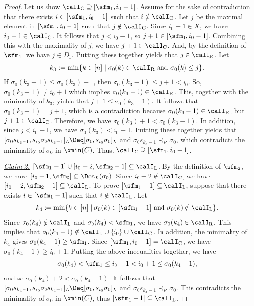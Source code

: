 \documentclass[12pt, reqno]{amsart}
\theoremstyle{definition}
\numberwithin{equation}{section} \numberwithin{figure}{section}
\numberwithin{table}{section}
\begin{document}
\begin{proof}
Let us show $\calI_\mathrm{C} \supseteq [\sfm_1, i_0 - 1]$.
Assume for the sake of contradiction that there exists $i \in [\sfm_1, i_0 - 1]$ such that $i \notin \calI_\mathrm{C}$.
Let $j$ be the maximal element in $[\sfm_1, i_0 - 1]$ such that $j \notin \calI_\mathrm{C}$.
Since $i_0 - 1 \in X$, we have $i_0 - 1 \in \calI_\mathrm{C}$.
It follows that $j < i_0 - 1$, so $j+1 \in [\sfm_1,i_0-1]$.
Combining this with the maximality of $j$, we have $j+1 \in \calI_\mathrm{C}$. 
And, by the definition of $\sfm_1$, we have $j \in D_1$.
Putting these together yields that $j \in \calI_\mathrm{R}$.
Let
\[
k_3 := \mathrm{min}\{
k \in [n] 
\mid  
\sigma_0(k) \in \calI_\mathrm{R} \  \text{and} \ 
\sigma_0(k)  \leq j \}.
\]
If $\sigma_0(k_3 -1) \le \sigma_0(k_3) + 1$, then $\sigma_0(k_3 -1) \le j + 1 < i_0$.
So, $\sigma_0(k_3 - 1) \neq i_0 + 1$ which implies $\sigma_0(k_3 -1) \in \calI_\mathrm{R}$.
This, together with the minimality of $k_3$, yields that $j+1 \le \sigma_0(k_3 -1)$.
It follows that $\sigma_0(k_3 - 1)  = j + 1$, 
which is a contradiction because $\sigma_0(k_3 -1) \in \calI_\mathrm{R}$, but $j+1 \in \calI_\mathrm{C}$.
Therefore, we have
$\sigma_0(k_3) + 1 < \sigma_0(k_3-1)$.
In addition, since $j < i_0 - 1$, we have $\sigma_0(k_3) < i_0 - 1$.
Putting these together yields that $[\sigma_0 s_{k_3 - 1}, s_{i_0} \sigma_0 s_{k_3 - 1}]_L \Deq [\sigma_0, s_{i_0}\sigma_0]_L$ and $\sigma_0 s_{k_3 - 1} \prec_R \sigma_0$, which contradicts the minimality of $\sigma_0$ in $\omin(C)$.
Thus, $\calI_\mathrm{C} \supseteq [\sfm_1, i_0 - 1]$.
\smallskip

{\it \underline{Claim 2.} $[\sfm_1 -1] \cup [i_0+2, \sfm_2+1] \subseteq \calI_\mathrm{L}$.}
By the definition of $\sfm_2$,
we have $[i_0 + 1, \sfm_2] \subseteq \Des_L(\sigma_0)$.
Since $i_0+2 \notin \calI_\mathrm{C}$, we have $[i_0+2, \sfm_2+1] \subseteq \calI_\mathrm{L}$.
To prove $[\sfm_1 - 1] \subseteq \calI_\mathrm{L}$, suppose that there exists $i \in [\sfm_1 - 1]$ such that $i \notin \calI_\mathrm{L}$.
Let
\[
k_4 := \mathrm{min}\{k \in [n] \mid \sigma_0(k) \in [\sfm_1 - 1] 
 \ \text{and} \ 
\sigma_0(k) \notin \calI_\mathrm{L}\}.
\]
Since $\sigma_0(k_4) \notin \calI_\mathrm{L}$ and $\sigma_0(k_4) < \sfm_1$, we have $\sigma_0(k_4) \in \calI_\mathrm{R}$. 
This implies that $\sigma_0(k_4-1) \notin \calI_\mathrm{L}  \cup  \{i_0\}  \cup  \calI_\mathrm{C}$.
In addition, the minimality of $k_4$ gives $\sigma_0(k_4 - 1) \geq \sfm_1$.
Since $[\sfm_1, i_0-1] = \calI_\mathrm{C}$, we have $\sigma_0(k_4 - 1) \geq i_0+1$.
Putting the above inequalities together,
we have
\[
\sigma_0(k_4) < \sfm_1 \le i_0-1 < i_0 + 1 \le \sigma_0(k_4-1),
\]
and so $\sigma_0(k_4) + 2 < \sigma_0(k_4 - 1)$.
It follows that $[\sigma_0 s_{k_4 - 1}, s_{i_0} \sigma_0 s_{k_4 - 1}]_L \Deq [\sigma_0, s_{i_0}\sigma_0]_L$ and $\sigma_0 s_{k_4 - 1} \prec_R \sigma_0$.
This contradicts the minimality of $\sigma_0$ in $\omin(C)$, thus $[\sfm_1 - 1] \subseteq \calI_\mathrm{L}$.
\smallskip


\end{proof}
\end{document}
